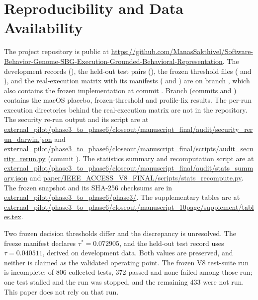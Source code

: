 \documentclass{ieeeaccess}
\begin{document}
\section{Reproducibility and Data Availability}\label{sec:repro}
The project repository is public at \url{https://github.com/ManasSakthivel/Software-Behavior-Genome-SBG-Execution-Grounded-Behavioral-Representation}. The development records (), the held-out test pairs (), the frozen threshold files ( and ), and the real-execution matrix with its manifests ( and ) are on branch , which also contains the frozen implementation at commit . Branch  (commits  and ) contains the macOS placebo, frozen-threshold and profile-fix results. The per-run execution directories behind the real-execution matrix are not in the repository. The security re-run output and its script are at \url{external_pilot/phase3_to_phase6/closeout/manuscript_final/audit/security_rerun_darwin.json} and \url{external_pilot/phase3_to_phase6/closeout/manuscript_final/scripts/audit_security_rerun.py} (commit ). The statistics summary and recomputation script are at \url{external_pilot/phase3_to_phase6/closeout/manuscript_final/audit/stats_summary.json} and \url{paper/IEEE_ACCESS_V8_FINAL/scripts/stats_recompute.py}. The frozen snapshot and its SHA-256 checksums are in \url{external_pilot/phase3_to_phase6/phase3/}. The supplementary tables are at \url{external_pilot/phase3_to_phase6/closeout/manuscript_10page/supplement/tables.tex}.

Two frozen decision thresholds differ and the discrepancy is unresolved. The freeze manifest declares $\tau^\ast=0.072905$, and the held-out test record uses $\tau=0.040511$, derived on development data. Both values are preserved, and neither is claimed as the validated operating point. The frozen V8 test-suite run is incomplete: of 806 collected tests, 372 passed and none failed among those run; one test stalled and the run was stopped, and the remaining 433 were not run. This paper does not rely on that run.
\end{document}

